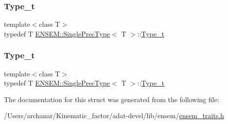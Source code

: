\subsubsection{\texorpdfstring{Type\_t}{Type\_t}\hspace{0.1cm}{\footnotesize\ttfamily [2/3]}}
{\footnotesize\ttfamily template$<$class T$>$ \\
typedef T \mbox{\hyperlink{structENSEM_1_1SinglePrecType}{E\+N\+S\+E\+M\+::\+Single\+Prec\+Type}}$<$ T $>$\+::\mbox{\hyperlink{structENSEM_1_1SinglePrecType_ab7ef789d62d59167eff4df3cc221c4e1}{Type\+\_\+t}}}

\mbox{\label{structENSEM_1_1SinglePrecType_ab7ef789d62d59167eff4df3cc221c4e1}} 
\subsubsection{\texorpdfstring{Type\_t}{Type\_t}\hspace{0.1cm}{\footnotesize\ttfamily [3/3]}}
{\footnotesize\ttfamily template$<$class T$>$ \\
typedef T \mbox{\hyperlink{structENSEM_1_1SinglePrecType}{E\+N\+S\+E\+M\+::\+Single\+Prec\+Type}}$<$ T $>$\+::\mbox{\hyperlink{structENSEM_1_1SinglePrecType_ab7ef789d62d59167eff4df3cc221c4e1}{Type\+\_\+t}}}



The documentation for this struct was generated from the following file\+:\begin{DoxyCompactItemize}
\item 
/\+Users/archanar/\+Kinematic\+\_\+factor/adat-\/devel/lib/ensem/\mbox{\hyperlink{adat-devel_2lib_2ensem_2ensem__traits_8h}{ensem\+\_\+traits.\+h}}\end{DoxyCompactItemize}
